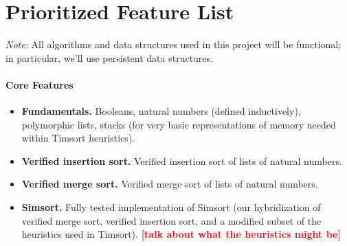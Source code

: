\documentclass{article}
\newcommand{\todo}[1]{\textcolor{red}{\textbf{\textsf{[#1]}}}}
\begin{document}
\section{Prioritized Feature List}
\emph{Note:} All algorithms and data structures used in this project will
be functional; in particular, we'll use persistent data structures.

\paragraph{Core Features}
\begin{itemize}
  \item \textbf{Fundamentals.}
    Booleans, natural numbers (defined inductively), polymorphic lists,
    stacks (for very basic representations of memory needed within Timsort
    heuristics).
  \item \textbf{Verified insertion sort.}
    Verified insertion sort of lists of natural numbers.
  \item \textbf{Verified merge sort.}
    Verified merge sort of lists of natural numbers.
  \item \textbf{Simsort.}
    Fully tested implementation of Simsort (our hybridization of verified
    merge sort, verified insertion sort, and a modified subset of the
    heuristics used in Timsort).
    \todo{talk about what the heuristics might be}

\end{itemize}
\end{document}

